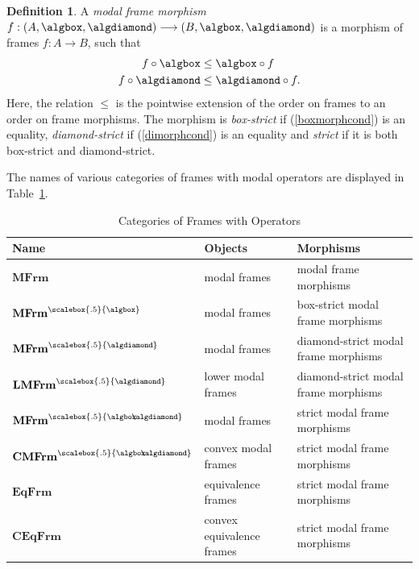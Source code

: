 \documentclass{article}[a4paper]
\theoremstyle{definition}
\newtheorem{definition}{Definition}%
\newcommand{\mfrm}{\mathbf{MFrm}}
\newcommand{\mfrms}{\mathbf{MFrm}^{\scalebox{.5}{\algbox\!\!\!\algdiamond}}}
\newcommand{\mfrmbs}{\mathbf{MFrm}^{\scalebox{.5}{\algbox}}}
\newcommand{\mfrmds}{\mathbf{MFrm}^{\scalebox{.5}{\algdiamond}}}
\newcommand{\eqfrm}{\mathbf{EqFrm}}
\newcommand{\lmfrmds}{\mathbf{LMFrm}^{\scalebox{.5}{\algdiamond}}}
\newcommand{\cmfrms}{\mathbf{CMFrm}^{\scalebox{.5}{\algbox\!\!\!\algdiamond}}}
\newcommand{\ceqfrm}{\mathbf{CEqFrm}}
\begin{document}
\begin{definition}
A \emph{modal frame morphism } 
$f:(A , \algbox , \algdiamond ) \longrightarrow (B ,  \algbox , \algdiamond )$ 
is a morphism of frames $f:A \longrightarrow B$, such that
\begin{align}
\label{boxmorphcond}
    f \circ \algbox & \leq \algbox \circ f \\
\label{dimorphcond} 
    f \circ \algdiamond & \leq \algdiamond \circ f . 
\end{align}
Here, the relation $\leq$ is the pointwise extension of the order 
on frames to an order on frame morphisms.
The morphism is \emph{box-strict} if (\ref{boxmorphcond}) is an equality, \emph{diamond-strict} if (\ref{dimorphcond}) is an equality and  
\emph{strict}  
if it is both box-strict and diamond-strict.

The names of various categories of frames with modal operators are displayed in Table~\ref{table:CatsOfFrames}.
\begin{table}[ht]
\begin{center}
\begin{tabular}{|l|l|l|}
\hline
Name    & Objects & Morphisms  \\ 
\hline
$\mfrm$ & modal frames & modal frame morphisms\\
$\mfrmbs$ & modal frames & box-strict modal frame morphisms\\
$\mfrmds$ & modal frames & diamond-strict modal frame morphisms\\
$\lmfrmds$ & lower modal frames & diamond-strict modal frame morphisms\\
$\mfrms$ & modal frames & strict modal frame morphisms \\
$\cmfrms$ & convex modal frames & strict modal frame morphisms\\
$\eqfrm$ & equivalence frames & strict modal frame morphisms\\
$\ceqfrm$ & convex equivalence frames & strict modal frame morphisms\\
\hline
\end{tabular}
\caption{Categories of Frames with Operators}
\label{table:CatsOfFrames}
\end{center}
\end{table}
\end{definition}
\end{document}
